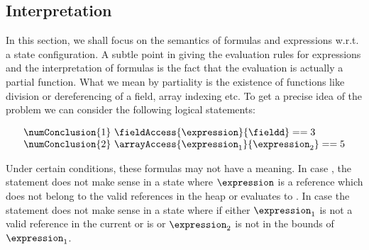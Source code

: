 
\newtheorem{interpretation}{Definition}[section]


\subsection{Interpretation}\label{interpret}
%
In this section, we shall focus on the semantics of formulas and expressions w.r.t. a state configuration.
A subtle point in giving the evaluation rules for expressions and the interpretation of formulas
is the fact that the evaluation is actually  a partial function. %
What we mean by partiality is the existence of functions like division or dereferencing of a field, array indexing etc. 
To get a precise idea of the problem we can consider the following logical statements: 

$$
\begin{array}{l} 
\numConclusion{1} \  \fieldAccess{\expression}{\fieldd} == 3\\
\numConclusion{2} \ \arrayAccess{\expression_1} {\expression_2} == 5
\end{array}
$$   

Under certain conditions, these formulas may not have a meaning. In case 
,  the statement does not make sense in a state where
$\expression$ is a reference which does not belong to the valid references in the heap 
or evaluates to  \Mynull. In case    the statement does not make sense in 
a state where if either $\expression_1 $ is not a valid reference in the current or is \Mynull{}  or $\expression_2$  is not in the bounds of $\expression_1 $.

